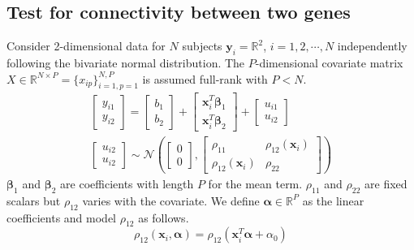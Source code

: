 \documentclass[aap, preprint]{imsart}
\numberwithin{equation}{section}
\theoremstyle{plain}
\begin{document}
\subsection{Test for connectivity between two genes \label{sec:framework2}}
Consider 2-dimensional data for $N$ subjects $\bm{y}_i = \mathbb{R}^2$, $i = 1, 2, \cdots, N$ independently following the bivariate normal distribution. The $P$-dimensional covariate matrix $X \in \mathbb{R}^{N \times P} = \{x_{ip}\}_{i=1,p=1}^{N,P}$ is assumed full-rank with $P < N$.
\begin{equation}
\begin{multlined}
    \begin{bmatrix} y_{i1} \\ y_{i2} \end{bmatrix} = 
    \begin{bmatrix} b_{1} \\ b_{2} \end{bmatrix} + 
    \begin{bmatrix} \bm{x}_i^T \bm{\beta}_1 \\ \bm{x}_i^T \bm{\beta}_2 \end{bmatrix} + 
    \begin{bmatrix} {u_{i1}} \\ {u_{i2}} \end{bmatrix}\\
    \begin{bmatrix} {u_{i2}} \\ u_{i2} \end{bmatrix} 
    \sim \mathcal{N}\left(
        \begin{bmatrix} 0 \\ 0 \end{bmatrix}, 
        \begin{bmatrix} \rho_{11} & \rho_{12}(\bm{x}_i) \\ 
        \rho_{12}(\bm{x}_i) & \rho_{22} \end{bmatrix}
    \right)
    \end{multlined}
    \label{eq:framework_2genes}
\end{equation}
$\bm{\beta}_1$ and $\bm{\beta}_2$ are coefficients with length $P$  for the mean term. $\rho_{11}$ and $\rho_{22}$ are fixed scalars but $\rho_{12}$ varies with the covariate. We define $\bm{\alpha} \in \mathbb{R}^{P}$ as the linear coefficients and model $\rho_{12}$ as follows.
\begin{equation}
    \rho_{12}(\bm{x}_i, \bm{\alpha}) = \rho_{12}(\bm{x}_i^T\bm{\alpha} + \alpha_0) \label{eq:rho}
\end{equation}
\end{document}
